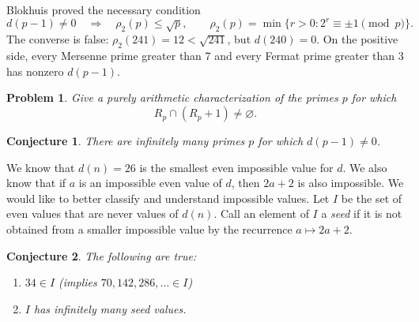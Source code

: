 \documentclass[a4paper]{article}
\newtheorem{conjecture}{Conjecture}
\newtheorem{problem}{Problem}
\begin{document}
	Blokhuis proved the necessary condition
	\begin{equation*}
		d(p-1)\neq0
		\quad\Longrightarrow\quad
		\rho_2(p)\leq\sqrt p,
		\qquad
		\rho_2(p)=\min\{r>0:2^r\equiv\pm1\pmod p\}.
	\end{equation*}
	The converse is false: $\rho_2(241)=12<\sqrt{241}$, but $d(240)=0$.
	On the positive side, every Mersenne prime greater than 7 and every Fermat prime greater than 3 has nonzero $d(p-1)$.

	\begin{problem}
		Give a purely arithmetic characterization of the primes $p$ for which
		\begin{equation*}
			R_p\cap(R_p+1)\neq\varnothing.
		\end{equation*}
	\end{problem}

	\begin{conjecture}
		There are infinitely many primes $p$ for which $d(p-1)\neq0$.
	\end{conjecture}

	We know that $d(n) = 26$ is the smallest even impossible value for $d$.
	We also know that if $a$ is an impossible even value of $d$, then $2a+2$ is also impossible.
	We would like to better classify and understand impossible values.
	Let $I$ be the set of even values that are never values of $d(n)$.
	Call an element of $I$ a \textit{seed} if it is not obtained from a smaller impossible value by the recurrence $a\mapsto2a+2$.
	\begin{conjecture}
		The following are true:
		\begin{enumerate}
			\item $34 \in I$ (implies $70, 142, 286, \ldots \in I$)
			\item $I$ has infinitely many seed values.
		\end{enumerate}
	\end{conjecture}
\end{document}
